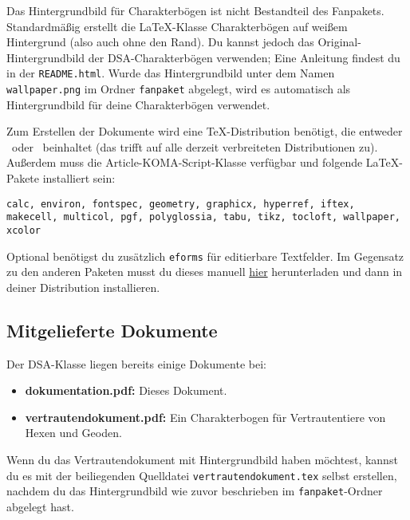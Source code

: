 \documentclass{dsa}
\begin{document}
  Das Hintergrundbild für Charakterbögen ist nicht Bestandteil des Fanpakets.
  Standardmäßig erstellt die \LaTeX-Klasse Charakterbögen auf weißem Hintergrund
  (also auch ohne den Rand). Du kannst jedoch das Original-Hintergrundbild der
  DSA-Charakterbögen verwenden; Eine Anleitung findest du in der \texttt{README.html}.
  Wurde das Hintergrundbild unter dem Namen \texttt{wallpaper.png} im Ordner 
  \texttt{fanpaket} abgelegt, wird es automatisch als Hintergrundbild für deine
  Charakterbögen verwendet.
  
  Zum Erstellen der Dokumente wird eine TeX-Distribution benötigt, die entweder
  \XeLaTeX \ oder \LuaLaTeX \ beinhaltet (das trifft auf alle derzeit verbreiteten
  Distributionen zu). Außerdem muss die Article-KOMA-Script-Klasse verfügbar und
  folgende \LaTeX-Pakete installiert sein:

  \vspace{-12pt}
  \begin{flushleft}
    \texttt{calc, environ, fontspec, geometry, graphicx, hyperref, iftex, makecell,
    multicol, pgf, polyglossia, tabu, tikz, tocloft, wallpaper, xcolor}
  \end{flushleft}
  \vspace{-12pt}

  Optional benötigst du zusätzlich \texttt{eforms} für editierbare Textfelder.
  Im Gegensatz zu den anderen Paketen musst du dieses manuell
  \href{http://www.ctan.org/pkg/eforms}{hier} herunterladen und dann in deiner
  Distribution installieren.
  
  \subsection*{Mitgelieferte Dokumente}
  
  Der DSA-Klasse liegen bereits einige Dokumente bei:
  
  \begin{itemize}
    \item \textbf{dokumentation.pdf:} Dieses Dokument.
    \item \textbf{vertrautendokument.pdf:} Ein Charakterbogen für
      Vertrautentiere von Hexen und Geoden.
  \end{itemize}
  
  Wenn du das Vertrautendokument mit Hintergrundbild haben möchtest, kannst du
  es mit der beiliegenden Quelldatei \texttt{vertrautendokument.tex} selbst
  erstellen, nachdem du das Hintergrundbild wie zuvor beschrieben im
  \texttt{fanpaket}-Ordner abgelegt hast.
  
\end{document}
